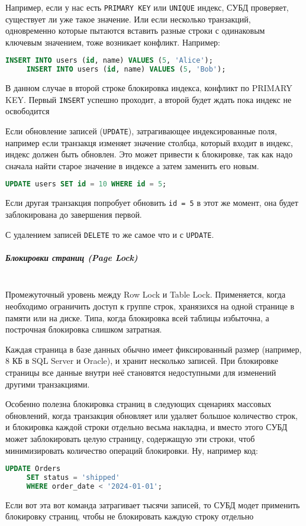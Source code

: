  Например, если у нас есть \texttt{PRIMARY KEY} или \texttt{UNIQUE} индекс, СУБД проверяет, существует ли уже такое значение. Или если несколько транзакций, одновременно которые пытаются вставить разные строки с одинаковым ключевым значением, тоже возникает конфликт. Например:
 \begin{lstlisting}[language=SQL]
     INSERT INTO users (id, name) VALUES (5, 'Alice');
     INSERT INTO users (id, name) VALUES (5, 'Bob');
 \end{lstlisting}
 В данном случае в второй строке блокировка индекса, конфликт по PRIMARY KEY. Первый \texttt{INSERT} успешно проходит, а второй будет ждать пока индекс не освободится
 
 Если обновление записей (\texttt{UPDATE}), затрагивающее индексированные поля, например если транзакця изменяет значение столбца, который входит в индекс, индекс должен быть обновлен. Это может привести к блокировке, так как надо сначала найти старое значение в индексе а затем заменить его новым.
 \begin{lstlisting}[language=SQL]
     UPDATE users SET id = 10 WHERE id = 5;
 \end{lstlisting}
 Если другая транзакция попробует обновить \texttt{id = 5} в этот же момент, она будет заблокирована до завершения первой.
 
 С удалением записей \texttt{DELETE} то же самое что и с \texttt{UPDATE}.
 
 \subparagraph{Блокировки страниц (Page Lock)} ~\\
 Промежуточный уровень между Row Lock и Table Lock. Применяется, когда необходимо ограничить доступ к группе строк, хранязихся на одной странице в памяти или на диске. Типа, когда блокировка всей таблицы избыточна, а построчная блокировка слишком затратная.
 
 Каждая страница в базе данных обычно имеет фиксированный размер (например, 8 КБ в SQL Server и Oracle), и хранит несколько записей. При блокировке страницы все данные внутри неё становятся недоступными для изменений другими транзакциями.
 
 Особенно полезна блокировка страниц в следующих сценариях массовых обновлений, когда транзакция обновляет или удаляет большое количество строк, и блокировка каждой строки отдельно весьма накладна, и вместо этого СУБД может заблокировать целую страницу, содержащую эти строки, чтоб минимизировать количество операций блокировки.
 Ну, например код:
 \begin{lstlisting}[language=SQL]
     UPDATE Orders
     SET status = 'shipped' 
     WHERE order_date < '2024-01-01';
 \end{lstlisting}
 Если вот эта вот команда затрагивает тысячи записей, то СУБД модет применить блокировку страниц, чтобы не блокировать каждую строку отдельно
 
